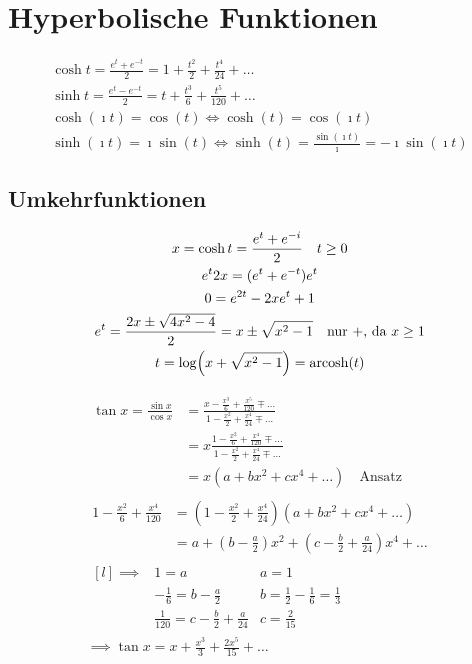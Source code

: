 \section{Hyperbolische Funktionen}
\begin{gather*}
	\cosh t = \frac{e^t + e^{-t}}{2} = 1 + \frac{t^2}{2} + \frac{t^4}{24} + \dots \\
	\sinh t = \frac{e^t - e^{-t}}{2} = t + \frac{t^3}{6} + \frac{t^5}{120} + \dots \\
	\cosh(\imath t) = \cos(t) \iff \cosh(t) = \cos(\imath t) \\
	\sinh(\imath t) = \imath \sin(t) \iff \sinh(t) = \frac{\sin(\imath t)}{\imath} = -\imath \sin(\imath t)
\end{gather*}

\subsection{Umkehrfunktionen}
\begin{gather*}
	x = \cosh t = \frac{e^t + e^{-i}}{2} \quad t \geq 0 \\
	e^t 2x = (e^t + e^{-t}) e^t \\
	0 = e^{2t} - 2x e^t + 1 \\
	e^t = \frac{2x \pm \sqrt{4x^2 - 4}}{2} = x \pm \sqrt{x^2 - 1} \quad \text{nur +, da } x \geq 1 \\
	t = \log( x + \sqrt{x^2 - 1} ) = \operatorname{arcosh}(t)
\end{gather*}
\begin{bem}
	\begin{gather*}
		\begin{split}
			\tan x = \frac{\sin x}{\cos x}	&= \frac{x - \frac{x^3}{6} + \frac{x^5}{120} \mp \dots}{1 - \frac{x^2}{2} + \frac{x^4}{24} \mp \dots} \\
									&= x \frac{1 - \frac{x^2}{6} + \frac{x^4}{120} \mp \dots}{1 - \frac{x^2}{2} + \frac{x^4}{24} \mp \dots} \\
									&= x ( a + b x^2 + c x^4 + \dots ) \quad \text{Ansatz}
		\end{split} \\
		\begin{split}
			1 - \frac{x^2}{6} + \frac{x^4}{120}	&= \left( 1 - \frac{x^2}{2} + \frac{x^4}{24} \right) (a + b x^2 + c x^4 +  \dots ) \\
										&= a + \left( b - \frac{a}{2} \right) x^2 + \left( c - \frac{b}{2} + \frac{a}{24} \right) x^4 + \dots
		\end{split} \\
		\begin{matrix*}[l]
			\implies	&1 = a							&a = 1	\\
					&-\frac{1}{6} = b - \frac{a}{2}			&b  =  \frac{1}{2} - \frac{1}{6} = \frac{1}{3}	\\
					&\frac{1}{120} = c - \frac{b}{2} + \frac{a}{24}	&c = \frac{2}{15}				
		\end{matrix*}\\
		\implies \tan x = x + \frac{x^3}{3} + \frac{2 x^5}{15} + \dots
	\end{gather*}
\end{bem}

